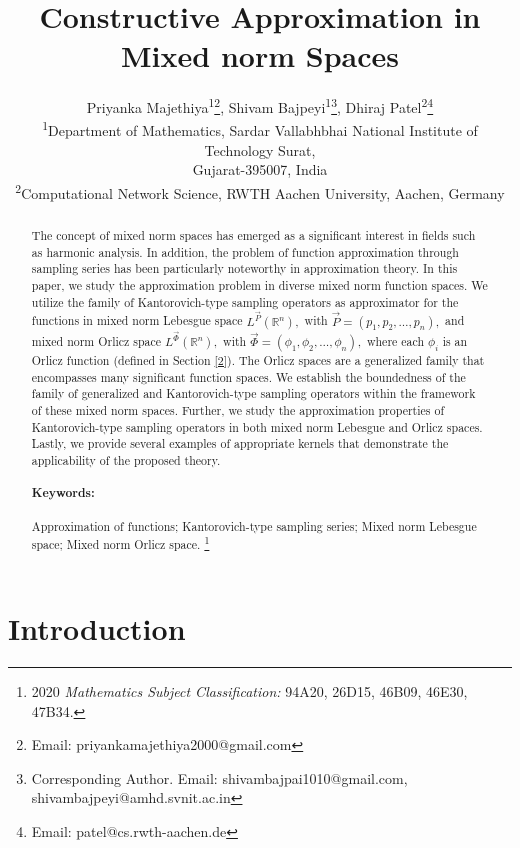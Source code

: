 \documentclass[11pt, a4paper]{article}
\title{Constructive Approximation in Mixed norm Spaces}
\author{
	Priyanka Majethiya\textsuperscript{1}\thanks{Email: priyankamajethiya2000@gmail.com}, Shivam Bajpeyi\textsuperscript{1}\thanks{Corresponding Author. Email: shivambajpai1010@gmail.com, shivambajpeyi@amhd.svnit.ac.in}, Dhiraj Patel\textsuperscript{2}\thanks{Email: patel@cs.rwth-aachen.de}\\
	{\small \textsuperscript{1}Department of Mathematics, Sardar Vallabhbhai National Institute of Technology Surat,}\\ {\small Gujarat-395007, India}\\
	{\small \textsuperscript{2}Computational Network Science, RWTH Aachen University, Aachen, Germany}
}
\date{}
\theoremstyle{definition}
\numberwithin{equation}{section}
\newcommand\blfootnote[1]{%
	\begingroup
	\renewcommand\thefootnote{}\footnote{#1}%
	\addtocounter{footnote}{-1}%
	\endgroup
}
\begin{document}
	
	\maketitle

\begin{abstract}
    The concept of mixed norm spaces has emerged as a significant interest in fields such as harmonic analysis. In addition, the problem of function approximation through sampling series has been particularly noteworthy in approximation theory. In this paper, we study the approximation problem in diverse mixed norm function spaces. We utilize the family of Kantorovich-type sampling operators as approximator for the functions in mixed norm Lebesgue space $L^{\overrightarrow{P}}(\mathbb{R}^n),$ with $ \overrightarrow{P}=(p_1,p_2,\dots,p_n),$ and mixed norm Orlicz space $L^{\overrightarrow{\Phi}}(\mathbb{R}^n),$ with $\overrightarrow{\Phi}=\left(\phi_{1},\phi_{2},\dots, \phi_{n} \right),$ where each $\phi_{i}$ is an Orlicz function (defined in Section \ref{2}). The Orlicz spaces are a generalized family that encompasses	many significant function spaces. We establish the boundedness of the family of generalized and Kantorovich-type sampling operators within the framework of these mixed norm spaces. Further, we study the approximation properties of Kantorovich-type sampling operators in both mixed norm Lebesgue and Orlicz spaces. Lastly, we provide several examples of appropriate kernels that demonstrate the applicability of the proposed theory.
    
    \paragraph{Keywords:}  Approximation of functions; Kantorovich-type sampling series; Mixed norm Lebesgue space; Mixed norm Orlicz space.
    \blfootnote{2020 \textit{Mathematics Subject Classification:} 94A20, 26D15, 46B09, 46E30, 47B34.}
\end{abstract}

\section{Introduction}
\end{document}
